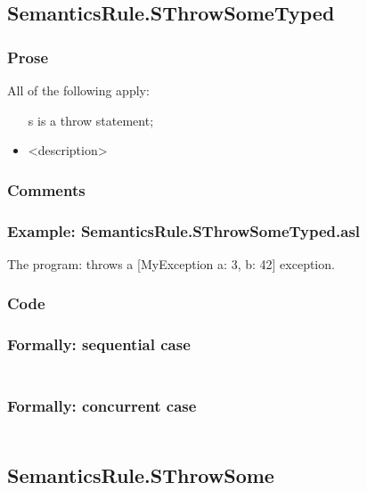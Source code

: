\documentclass{book}
\begin{document}
\subsection{SemanticsRule.SThrowSomeTyped \label{sec:SemanticsRule.SThrowSomeTyped}}

    \subsubsection{Prose}
    All of the following apply:
    \begin{itemize}
    \item [s] is a throw statement;
    \item <description>
    \end{itemize}

    \subsubsection{Comments}

    \subsubsection{Example: SemanticsRule.SThrowSomeTyped.asl}
    The program:
    throws a [MyException {a: 3, b: 42}] exception.

  \subsubsection{Code}

  \subsubsection{Formally: sequential case}
  \begin{align}
  \end{align} 

  \subsubsection{Formally: concurrent case}
  \begin{align}
  \end{align} 

\subsection{SemanticsRule.SThrowSome \label{sec:SemanticsRule.SThrowSome}}
\end{document}
